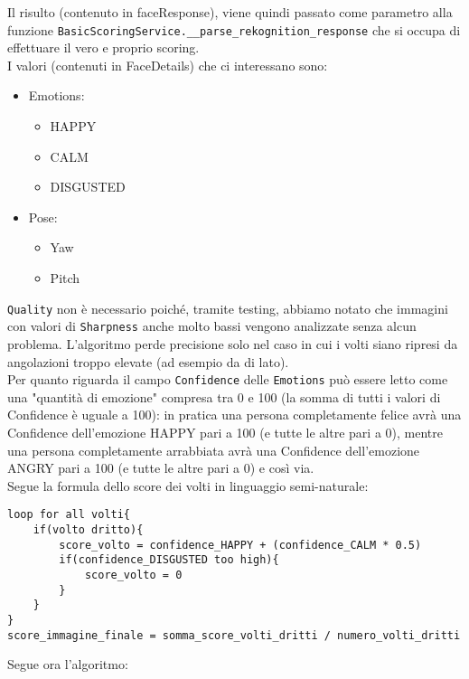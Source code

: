 Il risulto (contenuto in faceResponse), viene quindi passato come parametro alla funzione 
\verb+BasicScoringService.__parse_rekognition_response+ che si occupa di effettuare il vero
e proprio scoring.\\
I valori (contenuti in FaceDetails) che ci interessano sono:
\begin{itemize}
    \item Emotions: \begin{itemize}
        \item HAPPY
        \item CALM
        \item DISGUSTED \end{itemize}
    \item Pose: \begin{itemize}
        \item Yaw
        \item Pitch \end{itemize}
\end{itemize}
\verb+Quality+ non è necessario poiché, tramite testing, abbiamo notato che immagini con valori di 
\verb+Sharpness+ anche molto bassi vengono analizzate senza alcun problema. L'algoritmo perde precisione
solo nel caso in cui i volti siano ripresi da angolazioni troppo elevate (ad esempio da di lato).\\
Per quanto riguarda il campo \verb+Confidence+ delle \verb+Emotions+ può essere letto come una
"quantità di emozione" compresa tra 0 e 100 (la somma di tutti i valori di Confidence è uguale a 100):
in pratica una persona completamente felice avrà una Confidence dell'emozione HAPPY pari a 100 
(e tutte le altre pari a 0), mentre una persona completamente arrabbiata avrà una Confidence 
dell'emozione ANGRY pari a 100 (e tutte le altre pari a 0) e così via.\\
Segue la formula dello score dei volti in linguaggio semi-naturale:
\begin{lstlisting}
loop for all volti{
    if(volto dritto){
        score_volto = confidence_HAPPY + (confidence_CALM * 0.5)
        if(confidence_DISGUSTED too high){
            score_volto = 0
        }
    }
}
score_immagine_finale = somma_score_volti_dritti / numero_volti_dritti
\end{lstlisting}
Segue ora l'algoritmo: 
